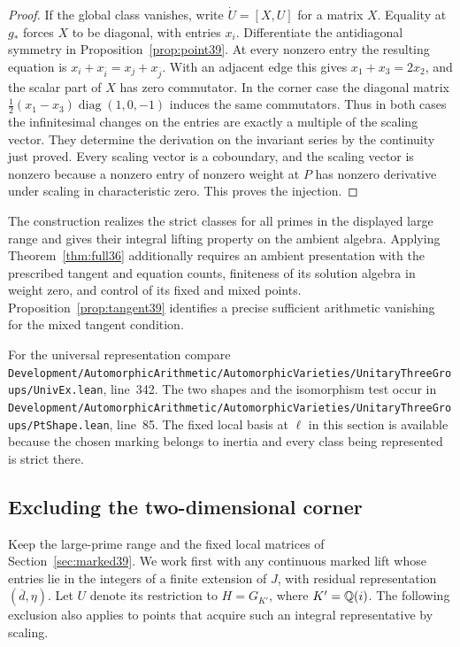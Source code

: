 \documentclass[a4paper,11pt]{article}
\theoremstyle{definition}
\theoremstyle{remark}
\newcommand{\lead}[1]{\par\smallskip\noindent{\bfseries\color{ink}#1.}\enspace}
\newcommand{\srcloc}[2]{{\small\nolinkurl{#1.lean}}, line~#2}
\numberwithin{equation}{section}
\begin{document}
\begin{proof}
If the global class vanishes, write \(\dot U=[X,U]\) for a matrix \(X\). Equality at \(g_*\) forces \(X\) to be diagonal, with entries \(x_i\). Differentiate the antidiagonal symmetry in Proposition~\ref{prop:point39}. At every nonzero entry the resulting equation is \(x_i+x_{\bar i}=x_j+x_{\bar j}\). With an adjacent edge this gives \(x_1+x_3=2x_2\), and the scalar part of \(X\) has zero commutator. In the corner case the diagonal matrix \(\tfrac12(x_1-x_3)\operatorname{diag}(1,0,-1)\) induces the same commutators. Thus in both cases the infinitesimal changes on the entries are exactly a multiple of the scaling vector. They determine the derivation on the invariant series by the continuity just proved. Every scaling vector is a coboundary, and the scaling vector is nonzero because a nonzero entry of nonzero weight at \(P\) has nonzero derivative under scaling in characteristic zero. This proves the injection.
\end{proof}

The construction realizes the strict classes for all primes in the displayed large range and gives their integral lifting property on the ambient algebra. Applying Theorem~\ref{thm:full36} additionally requires an ambient presentation with the prescribed tangent and equation counts, finiteness of its solution algebra in weight zero, and control of its fixed and mixed points. Proposition~\ref{prop:tangent39} identifies a precise sufficient arithmetic vanishing for the mixed tangent condition.

\lead{Locations in the accompanying source} For the universal representation compare \srcloc{Development/AutomorphicArithmetic/AutomorphicVarieties/UnitaryThreeGroups/UnivEx}{342}. The two shapes and the isomorphism test occur in \srcloc{Development/AutomorphicArithmetic/AutomorphicVarieties/UnitaryThreeGroups/PtShape}{85}. The fixed local basis at \(\ell\) in this section is available because the chosen marking belongs to inertia and every class being represented is strict there.

\subsection{Excluding the two-dimensional corner}\label{nav:IV-11}
\label{sec:corner40}

Keep the large-prime range and the fixed local matrices of Section~\ref{sec:marked39}. We work first with any continuous marked lift whose entries lie in the integers of a finite extension of \(J\), with residual representation \((\overline d,\eta)\). Let \(U\) denote its restriction to \(H=G_{K'}\), where \(K'=\mathbb Q(i)\). The following exclusion also applies to points that acquire such an integral representative by scaling.
\end{document}
